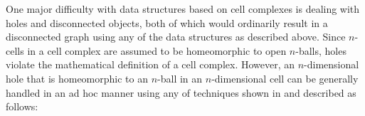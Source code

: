 One major difficulty with data structures based on cell complexes is dealing with holes and disconnected objects, both of which would ordinarily result in a disconnected graph using any of the data structures as described above.
Since $n$-cells in a cell complex are assumed to be homeomorphic to open $n$-balls, holes violate the mathematical definition of a cell complex.
However, an $n$-dimensional hole that is homeomorphic to an $n$-ball in an $n$-dimensional cell can be generally handled in an ad hoc manner using any of techniques shown in  and described as follows:
